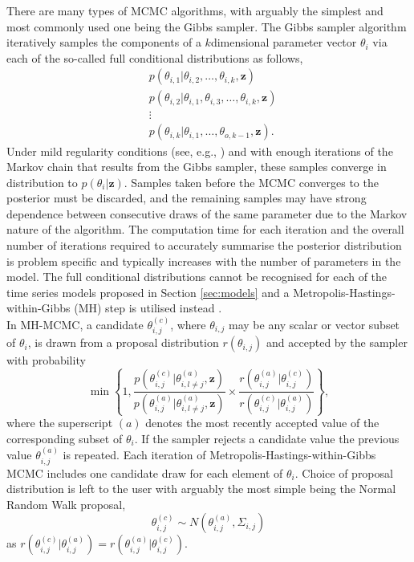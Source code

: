 \documentclass[12pt,a4paper]{article}\usepackage[]{graphicx}\usepackage[]{color}
\begin{document}
There are many types of MCMC algorithms, with arguably the simplest and most commonly used one being the Gibbs sampler. The Gibbs sampler algorithm iteratively samples the components of a $k$dimensional parameter vector $\theta_i$ via each of the so-called full conditional distributions as follows,
\begin{align}
&p(\theta_{i, 1} | \theta_{i, 2}, \dots, \theta_{i, k}, \textbf{z}) \nonumber \\
&p(\theta_{i, 2} | \theta_{i, 1}, \theta_{i, 3}, \dots, \theta_{i, k}, \textbf{z}) \nonumber \\
&\vdots \nonumber \\
&p(\theta_{i, k} | \theta_{i, 1}, \dots, \theta_{o, k-1}, \textbf{z}). \nonumber
\end{align}
Under mild regularity conditions (see, e.g., \citet{Tierney1994}) and with enough iterations of the Markov chain that results from the Gibbs sampler, these samples converge in distribution to $p(\theta_i | \textbf{z})$. Samples taken before the MCMC converges to the posterior must be discarded, and the remaining samples may have strong dependence between consecutive draws of the same parameter due to the Markov nature of the algorithm. The computation time for each iteration and the overall number of iterations required to accurately summarise the posterior distribution is problem specific and typically increases with the number of parameters in the model. The full conditional distributions cannot be recognised for each of the time series models proposed in Section \ref{sec:models} and a Metropolis-Hastings-within-Gibbs (MH) step is utilised instead \citep{Gilks1995}.
\\

In MH-MCMC, a candidate $\theta_{i, j}^{(c)}$, where $\theta_{i, j}$ may be any scalar or vector subset of $\theta_i$, is drawn from a proposal distribution $r(\theta_{i, j})$ and accepted by the sampler with probability
\begin{equation}
\min \left\{ 1, \frac{p(\theta_{i, j}^{(c)} | \theta_{i, l \neq j}^{(a)}, \textbf{z})}{p(\theta_{i, j}^{(a)} | \theta_{i, l \neq j}^{(a)}, \textbf{z})} \times \frac{r(\theta_{i, j}^{(a)} | \theta_{i, j}^{(c)})}{r(\theta_{i, j}^{(c)} | \theta_{i, j}^{(a)})} \right\},
\label{MHaccept}
\end{equation}
where the superscript $(a)$ denotes the most recently accepted value of the corresponding subset of $\theta_i$. If the sampler rejects a candidate value the previous value $\theta_{i, j}^{(a)}$ is repeated. Each iteration of Metropolis-Hastings-within-Gibbs MCMC includes one candidate draw for each element of $\theta_i$. Choice of proposal distribution is left to the user with arguably the most simple being the Normal Random Walk proposal,
\begin{equation}
\theta_{i, j}^{(c)} \sim N(\theta_{i, j}^{(a)}, \Sigma_{i, j})
\label{RWprop}
\end{equation}
as $r(\theta_{i, j}^{(c)} | \theta_{i, j}^{(a)}) = r(\theta_{i, j}^{(a)} | \theta_{i, j}^{(c)})$.
\\
\end{document}
